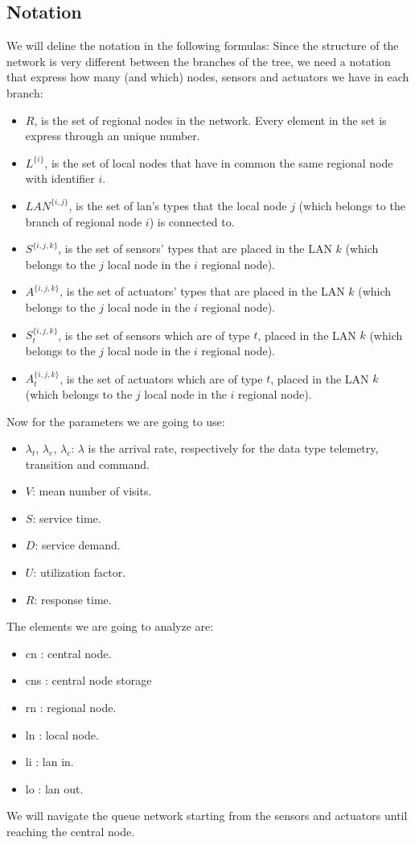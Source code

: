 \documentclass[11pt]{article}
\begin{document}
\subsection{Notation}
We will deline the notation in the following formulas:
Since the structure of the network is very different between the branches of the tree, we need a notation that express how many (and which) nodes, sensors and actuators we have in each branch:
\begin{itemize}
\item $R$, is the set of regional nodes in the network. Every element in the set is express through an unique number.
\item $L^{\{i\}}$, is the set of local nodes that have in common the same regional node with identifier $i$.
\item $LAN^{\{i,j\}}$, is the set of lan's types that the local node $j$ (which belongs to the branch of regional node $i$) is connected to.
\item $S^{\{i,j,k\}}$, is the set of sensors' types that are placed in the LAN $k$ (which belongs to the $j$ local node in the $i$ regional node).
\item $A^{\{i,j,k\}}$, is the set of actuators' types that are placed in the LAN $k$ (which belongs to the $j$ local node in the $i$ regional node).
\item $S^{\{i,j,k\}}_{t}$, is the set of sensors which are of type $t$, placed in the LAN $k$ (which belongs to the $j$ local node in the $i$ regional node).
\item $A^{\{i,j,k\}}_{t}$, is the set of actuators which are of type $t$, placed in the LAN $k$ (which belongs to the $j$ local node in the $i$ regional node).
\end{itemize}
Now for the parameters we are going to use:
\begin{itemize}
\item $\lambda_t$, $\lambda_e$, $\lambda_c$: $\lambda$ is the arrival rate, respectively for the data type telemetry, transition and command.
\item $V$: mean number of visits.
\item $S$: service time.
\item $D$: service demand.
\item $U$: utilization factor.
\item $R$: response time.
\end{itemize}
The elements we are going to analyze are:
\begin{itemize}
\item cn : central node.
\item cns : central node storage
\item rn : regional node.
\item ln : local node.
\item li : lan in.
\item lo : lan out.
\end{itemize}
We will navigate the queue network starting from the sensors and actuators until reaching the central node.
\end{document}
